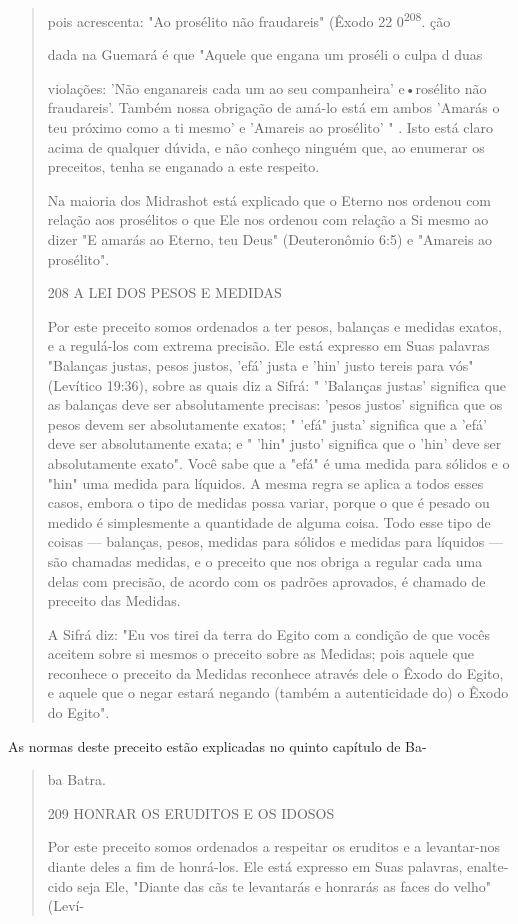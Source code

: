 \begin{quote}
pois acrescenta: "Ao prosélito não fraudareis" (Êxodo 22
0\textsuperscript{208}. ção

dada na Guemará é que "Aquele que engana um proséli o culpa d duas

violações: 'Não enganareis cada um ao seu companheira' e•rosélito não
fraudareis'. Também nossa obrigação de amá-lo está em ambos 'Amarás o
teu próximo como a ti mesmo' e 'Amareis ao prosélito' " . Isto está
claro acima de qualquer dúvida, e não conheço ninguém que, ao enumerar
os preceitos, te­nha se enganado a este respeito.

Na maioria dos Midrashot está explicado que o Eterno nos ordenou com
relação aos prosélitos o que Ele nos ordenou com relação a Si mesmo ao
dizer "E amarás ao Eterno, teu Deus" (Deuteronômio 6:5) e "Amareis ao
prosélito".

208 A LEI DOS PESOS E MEDIDAS

Por este preceito somos ordenados a ter pesos, balanças e medidas
exatos, e a regulá-los com extrema precisão. Ele está expresso em Suas
palavras "Balanças justas, pesos justos, 'efá' justa e 'hin' justo
tereis para vós" (Levítico 19:36), sobre as quais diz a Sifrá: "
'Balanças justas' significa que as balanças deve ser absolutamente
precisas: 'pesos justos' significa que os pesos devem ser absolutamente
exatos; " 'efá" justa' significa que a 'efá' deve ser absoluta­mente
exata; e " 'hin" justo' significa que o 'hin' deve ser absolutamente
exa­to". Você sabe que a "efá" é uma medida para sólidos e o "hin" uma
medida para líquidos. A mesma regra se aplica a todos esses casos,
embora o tipo de medidas possa variar, porque o que é pesado ou medido é
simplesmente a quan­tidade de alguma coisa. Todo esse tipo de coisas ---
balanças, pesos, medidas para sólidos e medidas para líquidos --- são
chamadas medidas, e o preceito que nos obriga a regular cada uma delas
com precisão, de acordo com os pa­drões aprovados, é chamado de preceito
das Medidas.

A Sifrá diz: "Eu vos tirei da terra do Egito com a condição de que vocês
aceitem sobre si mesmos o preceito sobre as Medidas; pois aquele que
reconhece o preceito da Medidas reconhece através dele o Êxodo do Egito,
e aquele que o negar estará negando (também a autenticidade do) o Êxodo
do Egito".
\end{quote}

As normas deste preceito estão explicadas no quinto capítulo de Ba-

\begin{quote}
ba Batra.

209 HONRAR OS ERUDITOS E OS IDOSOS

Por este preceito somos ordenados a respeitar os eruditos e a
levantar-nos diante deles a fim de honrá-los. Ele está expresso em Suas
palavras, enalte­cido seja Ele, "Diante das cãs te levantarás e honrarás
as faces do velho" (Leví-
\end{quote}

